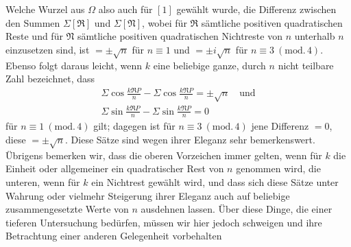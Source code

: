 Welche Wurzel aus \(\Omega\) also auch für \([1]\) gewählt wurde, die Differenz zwischen den Summen \(\Sigma[\mathfrak R]\) und \(\Sigma[\mathfrak N]\), wobei für \(\mathfrak R\) sämtliche positiven quadratischen Reste und für \(\mathfrak N\) sämtliche positiven quadratischen Nichtreste von \(n\) unterhalb \(n\) einzusetzen sind, ist \(=\pm\surd n\) für \(n\equiv1\) und \(=\pm i\surd n\) für \(n\equiv3\ (\mathrm{mod.}\,4)\). Ebenso folgt daraus leicht, wenn \(k\) eine beliebige ganze, durch \(n\) nicht teilbare Zahl bezeichnet, dass { \[\begin{gathered}\Sigma\cos\frac{k\mathfrak RP}{n}-\Sigma\cos\frac{k\mathfrak NP}{n}=\pm\surd n\quad\text{und}\\\Sigma\sin\frac{k\mathfrak RP}{n}-\Sigma\sin\frac{k\mathfrak NP}{n}=0\end{gathered}\]} für \(n\equiv1\ (\mathrm{mod.}\,4)\) gilt; dagegen ist für \(n\equiv3\ (\mathrm{mod.}\,4)\) jene Differenz \(=0\), diese
\(=\pm\surd n\). Diese Sätze sind wegen ihrer Eleganz sehr bemerkenswert. Übrigens bemerken wir, dass die oberen Vorzeichen immer gelten, wenn für \(k\) die Einheit oder allgemeiner ein quadratischer Rest von \(n\) genommen wird, die unteren, wenn für \(k\) ein Nichtrest gewählt wird, und dass sich diese Sätze unter Wahrung oder vielmehr Steigerung ihrer Eleganz auch auf beliebige zusammengesetzte Werte von \(n\) ausdehnen lassen. Über diese Dinge, die einer tieferen Untersuchung bedürfen, müssen wir hier jedoch schweigen und ihre Betrachtung einer anderen Gelegenheit vorbehalten

